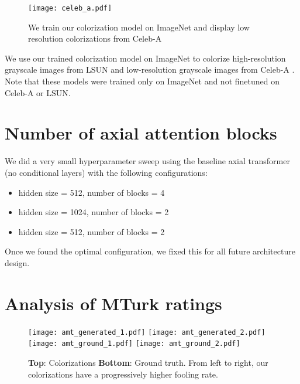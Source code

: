 \documentclass{article} \usepackage{iclr2021_conference,times}
\begin{document}
\begin{figure*}
\centering
\texttt{[image: celeb\_a.pdf]}
\caption{We train our colorization model on ImageNet and display low resolution colorizations from Celeb-A}
\label{fig:celeb_a}
\end{figure*}


We use our trained colorization model on ImageNet to colorize high-resolution grayscale images from LSUN  \citep{yu2015lsun} and low-resolution grayscale images from Celeb-A \citep{liu2015deep} . Note that these models were trained only on ImageNet and not finetuned on Celeb-A or LSUN.



\section{Number of axial attention blocks}

We did a very small hyperparameter sweep using the baseline axial transformer (no conditional layers) with the following configurations:

\begin{itemize}
    \item hidden size = 512, number of blocks = 4
    \item hidden size = 1024, number of blocks = 2
    \item hidden size = 512, number of blocks = 2
\end{itemize}

Once we found the optimal configuration, we fixed this for all future architecture design.




\section{Analysis of MTurk ratings}

\begin{figure*}
  \subfloat
  {\texttt{[image: amt\_generated\_1.pdf]}
  \texttt{[image: amt\_generated\_2.pdf]}
  }
  \qquad
  \subfloat
  {\texttt{[image: amt\_ground\_1.pdf]}
  \texttt{[image: amt\_ground\_2.pdf]}
  }
  \caption{\textbf{Top}: Colorizations \textbf{Bottom}: Ground truth. From left to right, our colorizations have a progressively higher fooling rate.}
\label{fig:mturk_v2}
\end{figure*}
\end{document}
